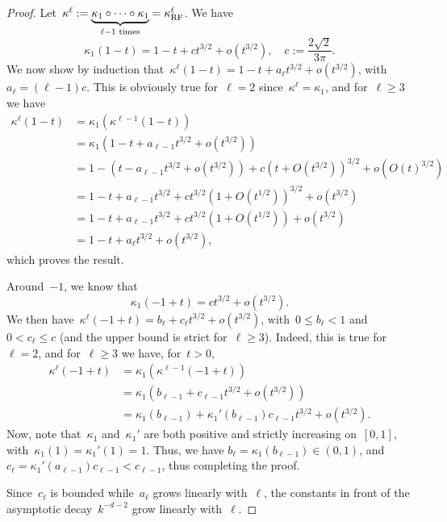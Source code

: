 \begin{proof}
Let~$\kappa^\ell := \underbrace{\kappa_1 \circ \cdots \circ \kappa_1}_{\ell-1 \text{ times}} = \kappa_{{\text{RF}}}^\ell$. We have
\begin{equation*}
\kappa_1(1 - t) = 1 - t + c t^{3/2} + o(t^{3/2}), \quad c := \frac{2\sqrt{2}}{3 \pi}.
\end{equation*}
We now show by induction that~$\kappa^\ell(1 - t) = 1 - t + a_\ell t^{3/2} + o(t^{3/2})$, with~$a_\ell = (\ell - 1) c$.
This is obviously true for~$\ell = 2$ since~$\kappa^\ell = \kappa_1$, and for~$\ell \geq 3$ we have
\begin{align*}
\kappa^\ell(1 - t) &= \kappa_1(\kappa^{\ell-1}(1 - t)) \\
	&= \kappa_1(1 - t + a_{\ell-1} t^{3/2} + o(t^{3/2})) \\
	&= 1 - (t - a_{\ell-1} t^{3/2} + o(t^{3/2})) + c (t + O(t^{3/2}))^{3/2} + o(O(t)^{3/2}) \\
	&= 1 - t + a_{\ell-1} t^{3/2} + c t^{3/2}(1 + O(t^{1/2}))^{3/2} + o(t^{3/2}) \\
	&= 1 - t + a_{\ell-1} t^{3/2} + c t^{3/2}(1 + O(t^{1/2})) + o(t^{3/2}) \\
	&= 1 - t + a_\ell t^{3/2} + o(t^{3/2}),
\end{align*}
which proves the result.

Around~$-1$, we know that
\begin{equation*}
\kappa_1(-1 + t) = ct^{3/2} + o(t^{3/2}).
\end{equation*}
We then have~$\kappa^\ell(-1+t) = b_\ell + c_\ell t^{3/2} + o(t^{3/2})$, with~$0 \leq b_\ell < 1$ and~$0 < c_\ell \leq c$ (and the upper bound is strict for~$\ell \geq 3$).
Indeed, this is true for~$\ell=2$, and for~$\ell \geq 3$ we have, for~$t > 0$,
\begin{align*}
\kappa^\ell(-1+t) &= \kappa_1(\kappa^{\ell-1}(-1+t)) \\
	&= \kappa_1(b_{\ell-1} + c_{\ell-1} t^{3/2} + o(t^{3/2})) \\
	&= \kappa_1(b_{\ell-1}) + \kappa_1'(b_{\ell-1}) c_{\ell-1} t^{3/2} + o(t^{3/2}).
\end{align*}
Now, note that~$\kappa_1$ and~$\kappa_1'$ are both positive and strictly increasing on~$[0, 1]$, with~$\kappa_1(1) = \kappa_1'(1) = 1$. Thus, we have $b_\ell = \kappa_1(b_{\ell-1}) \in (0, 1)$, and $c_\ell = \kappa_1'(a_{\ell-1}) c_{\ell-1} < c_{\ell-1}$, thus completing the proof.

Since~$c_\ell$ is bounded while~$a_\ell$ grows linearly with~$\ell$, the constants in front of the asymptotic decay~$k^{-d-2}$ grow linearly with~$\ell$.

\end{proof}

